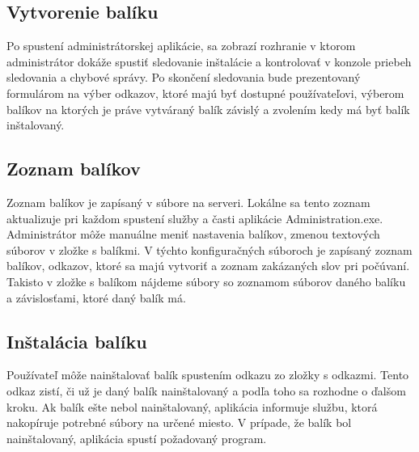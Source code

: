 \subsection{Vytvorenie balíku}
Po spustení administrátorskej aplikácie, sa zobrazí rozhranie v ktorom administrátor dokáže spustiť sledovanie inštalácie a kontrolovať v konzole priebeh sledovania a chybové správy. Po skončení sledovania bude prezentovaný formulárom na výber odkazov, ktoré majú byť dostupné používateľovi, výberom balíkov na ktorých je práve vytváraný balík závislý a zvolením kedy má byť balík inštalovaný.

\subsection{Zoznam balíkov}
Zoznam balíkov je zapísaný v súbore na serveri. Lokálne sa tento zoznam aktualizuje pri každom spustení služby a časti aplikácie Administration.exe. Administrátor môže manuálne meniť nastavenia balíkov, zmenou textových súborov v zložke s balíkmi. V týchto konfiguračných súboroch je zapísaný zoznam balíkov, odkazov, ktoré sa majú vytvoriť a zoznam zakázaných slov pri počúvaní. Takisto v zložke s balíkom nájdeme súbory so zoznamom súborov daného balíku a závislosťami, ktoré daný balík má.

\subsection{Inštalácia balíku}
Používateľ môže nainštalovať balík spustením odkazu zo zložky s odkazmi. Tento odkaz zistí, či už je daný balík nainštalovaný a podľa toho sa rozhodne o ďalšom kroku. Ak balík ešte nebol nainštalovaný, aplikácia informuje službu, ktorá nakopíruje potrebné súbory na určené miesto. V prípade, že balík bol nainštalovaný, aplikácia spustí požadovaný program.